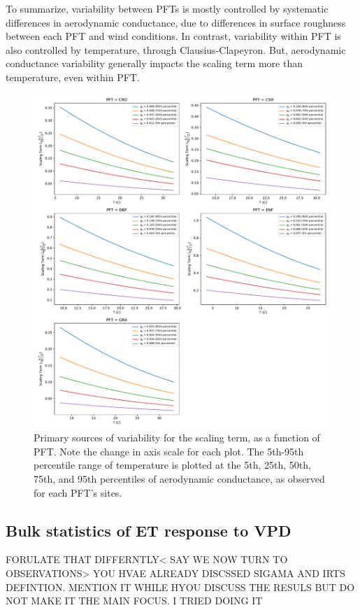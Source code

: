 \documentclass[draft,linenumbers]{gcbjournal}
\begin{document}
To summarize, variability between PFTs is mostly controlled by systematic differences in aerodynamic conductance, due to differences in surface roughness between each PFT and wind conditions. In contrast, variability within PFT is also controlled by temperature, through Clausius-Clapeyron. But, aerodynamic conductance variability generally impacts the scaling term more than temperature, even within PFT.

\begin{figure}[!p]
\centering
\includegraphics[width=\textwidth]{./fig04b.pdf}
\caption{Primary sources of variability for the scaling term, as a function of PFT. Note the change in axis scale for each plot. The 5th-95th percentile range of temperature is plotted at the 5th, 25th, 50th, 75th, and 95th percentiles of aerodynamic conductance, as observed for each PFT's sites.}
\label{scale_vary}
\end{figure}

\subsection{Bulk statistics of ET response to VPD}
\label{stats_sec}
FORULATE THAT DIFFERNTLY< SAY WE NOW TURN TO OBSERVATIONS> YOU HVAE ALREADY DISCSSED SIGAMA AND IRTS DEFINTION. MENTION IT WHILE HYOU DISCUSS THE RESULS BUT DO NOT MAKE IT THE MAIN FOCUS. I TRIED DOING IT
\end{document}
